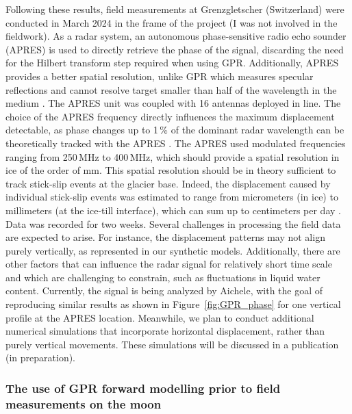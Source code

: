 Following these results, field measurements at Grenzgletscher (Switzerland) were conducted in March 2024 in the frame of the project (I was not involved in the fieldwork). As a radar system, an autonomous phase-sensitive radio echo sounder (APRES) is used to directly retrieve the phase of the signal, discarding the need for the Hilbert transform step required when using GPR. Additionally, APRES provides a better spatial resolution, unlike GPR which measures specular reflections and cannot resolve target smaller than half of the wavelength in the medium \citep{Davis&Annan1989}. The APRES unit was coupled with 16 antennas deployed in line. The choice of the APRES frequency directly influences the maximum displacement detectable, as phase changes up to 1\,\% of the dominant radar wavelength can be theoretically tracked with the APRES \citep{Nicholls&al2015}. The APRES used modulated frequencies ranging from 250\,MHz to 400\,MHz, which should provide a spatial resolution in ice of the order of mm. This spatial resolution should be in theory sufficient to track stick-slip events at the glacier base. Indeed, the displacement caused by individual stick-slip events was estimated to range from micrometers (in ice) to millimeters (at the ice-till interface), which can sum up to centimeters per day \citep{Graff&al2021}. Data was recorded for two weeks. Several challenges in processing the field data are expected to arise. For instance, the displacement patterns may not align purely vertically, as represented in our synthetic models. Additionally, there are other factors that can influence the radar signal for relatively short time scale and which are challenging to constrain, such as fluctuations in liquid water content. Currently, the signal is being analyzed by Aichele, with the goal of reproducing similar results as shown in Figure~\ref{fig:GPR_phase} for one vertical profile at the APRES location. Meanwhile, we plan to conduct additional numerical simulations that incorporate horizontal displacement, rather than purely vertical movements. These simulations will be discussed in a publication (in preparation).

\subsubsection{The use of GPR forward modelling prior to field measurements on the moon}

